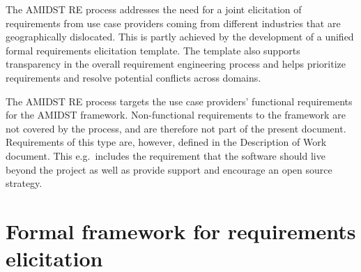 \documentclass[11pt, oneside]{article}   	%
\begin{document}
The AMIDST RE process addresses the need for a joint elicitation of requirements from use case providers coming from
different industries that are geographically dislocated. This is partly achieved by the development of a 
unified formal requirements elicitation template. The template also supports transparency in the overall
requirement engineering process and helps prioritize requirements and resolve potential conflicts across domains.  

The AMIDST RE process targets the use case providers' functional requirements for the AMIDST framework. Non-functional requirements to the framework are not covered by the process,
and are therefore not part of the present document. Requirements of this type are, however, defined in the Description
of Work document. This e.g.\ includes the requirement that the software should live beyond the project as well as
provide support and
encourage an open source strategy.


\newpage














\appendix


\section{Formal framework for requirements elicitation}
\label{sec:form-fram-requ}


\end{document}
